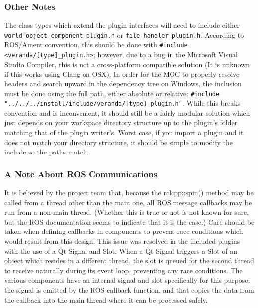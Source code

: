 \begin{itemize}
\subsubsection*{Other Notes}
The class types which extend the plugin interfaces will need to include either \lstinline|world_object_component_plugin.h| or \lstinline|file_handler_plugin.h|. According to ROS/Ament convention, this should be done with \lstinline|#include <veranda/[type]_plugin.h>|; however, due to a bug in the Microsoft Visual Studio Compiler, this is not a cross-platform compatible solution (It is unknown if this works using Clang on OSX). In order for the MOC to properly resolve headers and search upward in the dependency tree on Windows, the inclusion must be done using the full path, either absolute or relative: \lstinline|#include "../../../install/include/veranda/[type]_plugin.h"|. While this breaks convention and is inconvenient, it should still be a fairly modular solution which just depends on your workspace directory structure up to the plugin's folder matching that of the plugin writer's. Worst case, if you import a plugin and it does not match your directory structure, it should be simple to modify the include so the paths match.

\subsubsection*{A Note About ROS Communications}
It is believed by the project team that, because the rclcpp::spin() method may be called from a thread other than the main one, all ROS message callbacks may be run from a non-main thread. (Whether this is true or not is not known for sure, but the ROS documentation seems to indicate that it is the case.) Care should be taken when defining callbacks in components to prevent race conditions which would result from this design. This issue was resolved in the included plugins with the use of a Qt Signal and Slot. When a Qt Signal triggers a Slot of an object which resides in a different thread, the slot is queued for the second thread to receive naturally during its event loop, preventing any race conditions. The various components have an internal signal and slot specifically for this purpose; the signal is emitted by the ROS callback function, and that copies the data from the callback into the main thread where it can be processed safely.

\end{itemize}